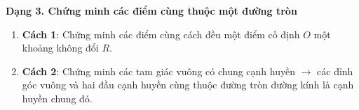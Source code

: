 \textbf{Dạng 3. Chứng minh các điểm cùng thuộc một đường tròn}
\begin{enumerate}
\item \textbf{Cách 1}: Chứng minh các điểm cùng cách đều một điểm cố định $O$ một khoảng không đổi $R$.
\item \textbf{Cách 2}: Chứng minh các tam giác vuông có chung cạnh huyền $\rightarrow$ các đỉnh góc vuông và hai đầu cạnh huyền cùng thuộc đường tròn đường kính là cạnh huyền chung đó.
\end{enumerate}
